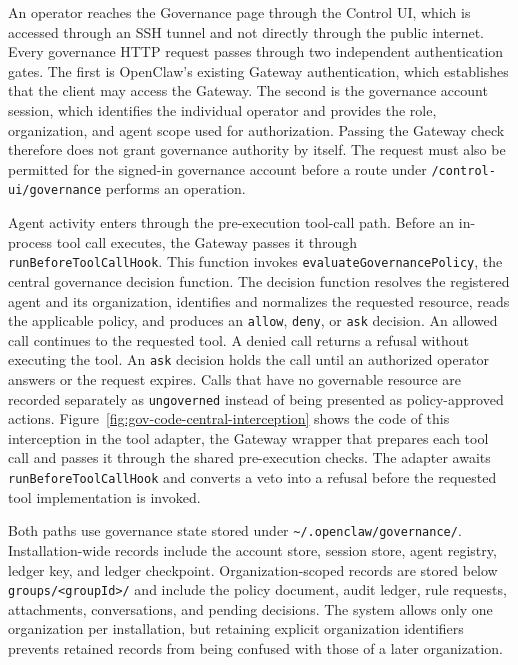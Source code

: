 An operator reaches the Governance page through the Control UI, which is
accessed through an SSH tunnel and not directly through the public
internet. Every governance HTTP request passes through two independent
authentication gates. The first is OpenClaw's existing Gateway authentication,
which establishes that the client may access the Gateway. The second is the
governance account session, which identifies the individual operator and
provides the role, organization, and agent scope used for authorization.
Passing the Gateway check therefore does not grant governance authority by
itself. The request must also be permitted for the signed-in governance
account before a route under \texttt{/control-ui/governance} performs an
operation.

Agent activity enters through the pre-execution tool-call path. Before an
in-process tool call executes, the Gateway passes it through
\texttt{runBeforeToolCallHook}. This function invokes
\texttt{evaluateGovernancePolicy}, the central governance decision function.
The decision function resolves the registered agent and its organization,
identifies and normalizes the requested resource, reads the applicable policy,
and produces an \texttt{allow}, \texttt{deny}, or \texttt{ask} decision. An
allowed call continues to the requested tool. A denied call returns a refusal
without executing the tool. An \texttt{ask} decision holds the call until an
authorized operator answers or the request expires. Calls that have no
governable resource are recorded separately as \texttt{ungoverned} instead of
being presented as policy-approved actions. Figure~\ref{fig:gov-code-central-interception} shows the code of this interception in the
tool adapter, the Gateway wrapper that prepares each tool
call and passes it through the shared pre-execution checks. The adapter awaits \texttt{runBeforeToolCallHook} and converts a
veto into a refusal before the requested tool implementation is
invoked.

Both paths use governance state stored under
\texttt{\textasciitilde/.openclaw/governance/}. Installation-wide records
include the account store, session store, agent registry, ledger key, and ledger
checkpoint. Organization-scoped records are stored below
\texttt{groups/<groupId>/} and include the policy document, audit ledger, rule
requests, attachments, conversations, and pending decisions. The system allows only one organization per installation, but retaining explicit
organization identifiers prevents retained records from being confused with
those of a later organization.

